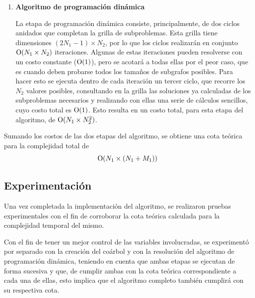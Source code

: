 \begin{enumerate}[label=(\roman*)]
\item \textbf{Algoritmo de programación dinámica}

La etapa de programación dinámica consiste, principalmente, de dos ciclos
anidados que completan la grilla de subproblemas. Esta grilla tiene
dimensiones $(2 N_1 - 1) \times N_2$, por lo que los ciclos realizarán en
conjunto $\operatorname{O}(N_1 \times N_2)$ iteraciones. Algunas de estas iteraciones
pueden resolverse con un costo constante ($\operatorname{O}(1)$), pero se acotará a todas
ellas por el peor caso, que es cuando deben probarse todos los tamaños de
subgrafos posibles. Para hacer esto se ejecuta dentro de cada iteración un
tercer ciclo, que recorre los $N_2$ valores posibles, consultando
en la grilla las soluciones ya calculadas de los subproblemas necesarios
y realizando con ellas una serie de cálculos sencillos, cuyo costo total es
$\operatorname{O}(1)$. Esto resulta en un costo total, para esta etapa del algoritmo,
de $\operatorname{O}(N_1 \times N_2^2)$.

\end{enumerate}

Sumando los costos de las dos etapas del algoritmo, se obtiene una cota
teórica para la complejidad total de
\[ \operatorname{O}(N_1 \times (N_1 + M_1)) \]

\subsection{Experimentación}
Una vez completada la implementación del algoritmo, se realizaron pruebas
experimentales con el fin de corroborar la cota teórica calculada para la
complejidad temporal del mismo.

Con el fin de tener un mejor control de las variables involucradas, se
experimentó por separado con la creación del coárbol y con la resolución del
algoritmo de programación dinámica, teniendo en cuenta que ambas etapas se
ejecutan de forma sucesiva y que, de cumplir ambas con la cota teórica
correspondiente a cada una de ellas, esto implica que el algoritmo completo
también cumplirá con su respectiva cota.


